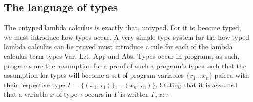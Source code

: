 \documentclass[11pt,oneside,a4paper]{report}
\begin{document}

\subsection{The language of types}
The untyped lambda calculus is exactly that, untyped.
For it to become typed, we must introduce how types occur.
A very simple type system for the how typed lambda calculus can be proved must introduce a rule for each of the lambda calculus term types Var, Let, App and Abs.
Types occur in programs, as such, programs are the assumption for a proof of such a program's types such that the assumption for types will become a set of program variables $\{x_1 \dots x_n\}$ paired with their respective type $\Gamma = \{(x_1 : \tau_1)\}, \dots (x_n : \tau_n)\}$.
Stating that it is assumed that a variable $x$ of type $\tau$ occurs in $\Gamma$ is written $\Gamma, x: \tau$
\end{document}
